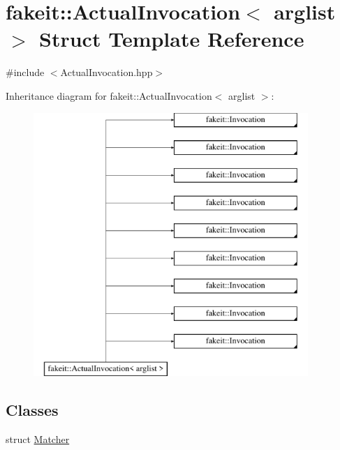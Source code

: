 \hypertarget{structfakeit_1_1ActualInvocation}{}\section{fakeit\+::Actual\+Invocation$<$ arglist $>$ Struct Template Reference}
\label{structfakeit_1_1ActualInvocation}


{\ttfamily \#include $<$Actual\+Invocation.\+hpp$>$}

Inheritance diagram for fakeit\+::Actual\+Invocation$<$ arglist $>$\+:\begin{figure}[H]
\begin{center}
\leavevmode
\includegraphics[height=10.000000cm]{structfakeit_1_1ActualInvocation}
\end{center}
\end{figure}
\subsection*{Classes}
\begin{DoxyCompactItemize}
\item 
struct \mbox{\hyperlink{structfakeit_1_1ActualInvocation_1_1Matcher}{Matcher}}
\end{DoxyCompactItemize}
